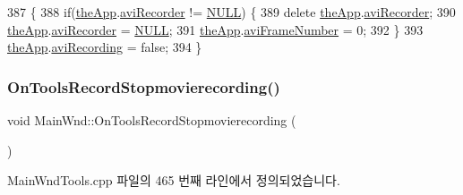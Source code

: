 \begin{DoxyCode}
387 \{
388   \textcolor{keywordflow}{if}(\mbox{\hyperlink{_v_b_a_8cpp_a8095a9d06b37a7efe3723f3218ad8fb3}{theApp}}.\mbox{\hyperlink{class_v_b_a_a761be1e36182d12710a199a50c0df020}{aviRecorder}} != \mbox{\hyperlink{getopt1_8c_a070d2ce7b6bb7e5c05602aa8c308d0c4}{NULL}}) \{
389     \textcolor{keyword}{delete} \mbox{\hyperlink{_v_b_a_8cpp_a8095a9d06b37a7efe3723f3218ad8fb3}{theApp}}.\mbox{\hyperlink{class_v_b_a_a761be1e36182d12710a199a50c0df020}{aviRecorder}};
390     \mbox{\hyperlink{_v_b_a_8cpp_a8095a9d06b37a7efe3723f3218ad8fb3}{theApp}}.\mbox{\hyperlink{class_v_b_a_a761be1e36182d12710a199a50c0df020}{aviRecorder}} = \mbox{\hyperlink{getopt1_8c_a070d2ce7b6bb7e5c05602aa8c308d0c4}{NULL}};
391     \mbox{\hyperlink{_v_b_a_8cpp_a8095a9d06b37a7efe3723f3218ad8fb3}{theApp}}.\mbox{\hyperlink{class_v_b_a_a3b3857d94f1df7cf3b722ad494547324}{aviFrameNumber}} = 0;
392   \}
393   \mbox{\hyperlink{_v_b_a_8cpp_a8095a9d06b37a7efe3723f3218ad8fb3}{theApp}}.\mbox{\hyperlink{class_v_b_a_a96743b6c6ee2d9b45c52b981136e3738}{aviRecording}} = \textcolor{keyword}{false};
394 \}
\end{DoxyCode}
\mbox{\label{class_main_wnd_a5bd28d030d2596417ba4479fe7a5dfad}} 
\subsubsection{\texorpdfstring{On\+Tools\+Record\+Stopmovierecording()}{OnToolsRecordStopmovierecording()}}
{\footnotesize\ttfamily void Main\+Wnd\+::\+On\+Tools\+Record\+Stopmovierecording (\begin{DoxyParamCaption}{ }\end{DoxyParamCaption})\hspace{0.3cm}{\ttfamily [protected]}}



Main\+Wnd\+Tools.\+cpp 파일의 465 번째 라인에서 정의되었습니다.


